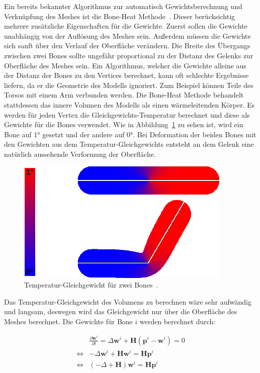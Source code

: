 Ein bereits bekannter Algorithmus zur automatisch Gewichtsberechnung und Verknüpfung des Meshes ist die Bone-Heat Methode~\cite{bone_heat_paper}. Dieser berücksichtig mehrere zusätzliche Eigenschaften für die Gewichte. Zuerst sollen die Gewichte unabhängig von der Auflösung des Meshes sein. Außerdem müssen die Gewichte sich sanft über den Verlauf der Oberfläche verändern. Die Breite des Übergangs zwischen zwei Bones sollte ungefähr proportional zu der Distanz des Gelenks zur Oberfläche des Meshes sein.
Ein Algorithmus, welcher die Gewichte alleine aus der Distanz der Bones zu den Vertices berechnet, kann oft schlechte Ergebnisse liefern, da er die Geometrie des Modells ignoriert. Zum Beispiel können Teile des Torsos mit einem Arm verbunden werden. Die Bone-Heat Methode behandelt stattdessen das innere Volumen des Modells als einen wärmeleitenden Körper. Es werden für jeden Vertex die Gleichgewichts-Temperatur berechnet und diese als Gewichte für die Bones verwendet. Wie in Abbildung~\ref{fig:bone_heat_equilibrium} zu sehen ist, wird ein Bone auf 1° gesetzt und der andere auf 0°. Bei Deformation der beiden Bones mit den Gewichten aus dem Temperatur-Gleichgewichts entsteht an dem Gelenk eine natürlich aussehende Verformung der Oberfläche.

\begin{figure}[h!]
	\centering
	\includegraphics[width=0.7\linewidth]{resources/img/bone_heat_equilibrium.png}
	\caption{Temperatur-Gleichgewicht für zwei Bones~\cite{bone_heat_paper}.}
	\label{fig:bone_heat_equilibrium}
\end{figure}

Das Temperatur-Gleichgewicht des Volumens zu berechnen wäre sehr aufwändig und langsam, deswegen wird das Gleichgewicht nur über die Oberfläche des Meshes berechnet. Die Gewichte für Bone $i$ werden berechnet durch:

\begin{equation}
    \label{eq:bone_heat}
    \begin{aligned}
        &\frac{\partial\mathbf{w}^i}{\partial t} = \Delta\mathbf{w}^i+\mathbf{H}\left(\mathbf{p}^i-\mathbf{w}^i\right)=0 \\
        \iff &-\Delta\mathbf{w}^i+\mathbf{H}\mathbf{w}^i=\mathbf{H}\mathbf{p}^i \\
        \iff &\left(-\Delta+\mathbf{H}\right)\mathbf{w}^i=\mathbf{H}\mathbf{p}^i
    \end{aligned}
\end{equation}

